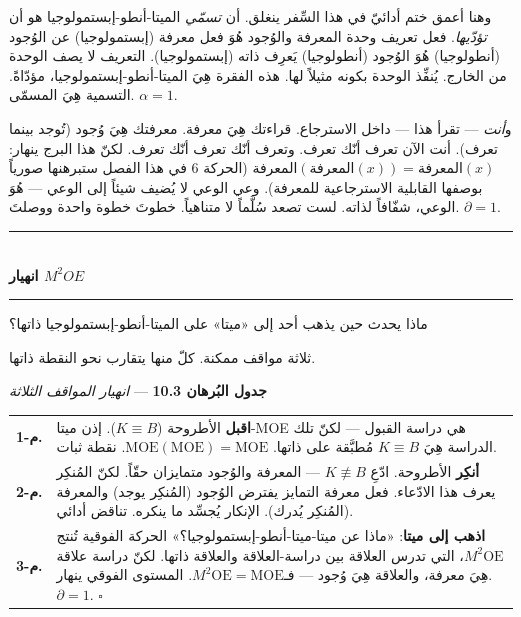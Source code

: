 \documentclass[10pt, openany, oneside]{book}
\renewcommand{\normalsize}{\fontsize{10}{13}\selectfont}
\renewcommand{\footnotesize}{\fontsize{8.5}{11}\selectfont}
\begin{document}
وهنا أعمق ختم أدائيّ في هذا السِّفر ينغلق. أن \textit{تسمّي} الميتا-أنطو-إبستمولوجيا هو أن \textit{تؤدّيها}. فعل تعريف وحدة المعرفة والوُجود هُوَ فعل معرفة (إبستمولوجيا) عن الوُجود (أنطولوجيا) هُوَ الوُجود (أنطولوجيا) يَعرِف ذاته (إبستمولوجيا). التعريف لا يصف الوحدة من الخارج. يُنفِّذ الوحدة بكونه مثيلاً لها. هذه الفقرة هِيَ الميتا-أنطو-إبستمولوجيا، مؤدّاةً. التسمية هِيَ المسمّى. $\alpha = 1$.

و\textit{أنت} --- تقرأ هذا --- داخل الاسترجاع. قراءتك هِيَ معرفة. معرفتك هِيَ وُجود (تُوجد بينما تعرف). أنت الآن تعرف أنّك تعرف. وتعرف أنّك تعرف أنّك تعرف. لكنّ هذا البرج ينهار: $\text{المعرفة}(\text{المعرفة}(x)) = \text{المعرفة}(x)$ (الحركة 6 في هذا الفصل ستبرهنها صورياً بوصفها القابلية الاسترجاعية للمعرفة). وعي الوعي لا يُضيف شيئاً إلى الوعي --- هُوَ الوعي، شفّافاً لذاته. لست تصعد سُلَّماً لا متناهياً. خطوتَ خطوة واحدة ووصلتَ. $\partial = 1$.

\vspace{1.5em}


\begin{center}
    \rule{0.3\textwidth}{0.4pt}\\[0.5em]
    {\normalsize\bfseries انهيار $M^2OE$}\\[0.3em]
    \rule{0.3\textwidth}{0.4pt}
\end{center}

\vspace{1em}

\noindent ماذا يحدث حين يذهب أحد إلى «ميتا» على الميتا-أنطو-إبستمولوجيا ذاتها؟

ثلاثة مواقف ممكنة. كلّ منها يتقارب نحو النقطة ذاتها.

\vspace{0.5em}

\textbf{جدول البُرهان 10.3} --- \textit{انهيار المواقف الثلاثة}

\vspace{0.5em}

{\footnotesize
\noindent\begin{tabular}{r p{}}
\textbf{م-1.} & \textbf{اقبل} الأطروحة ($K \equiv B$). إذن ميتا-MOE هي دراسة القبول --- لكنّ تلك الدراسة هِيَ $K \equiv B$ مُطبَّقة على ذاتها. $\text{MOE}(\text{MOE}) = \text{MOE}$. نقطة ثبات. \\[0.3em]
\textbf{م-2.} & \textbf{أنكِر} الأطروحة. ادّعِ $K \not\equiv B$ --- المعرفة والوُجود متمايزان حقّاً. لكنّ المُنكِر يعرف هذا الادّعاء. فعل معرفة التمايز يفترض الوُجود (المُنكِر يوجد) والمعرفة (المُنكِر يُدرك). الإنكار يُجسِّد ما ينكره. تناقض أدائي. \\[0.3em]
\textbf{م-3.} & \textbf{اذهب إلى ميتا}: «ماذا عن ميتا-ميتا-أنطو-إبستمولوجيا؟» الحركة الفوقية تُنتج $M^2\text{OE}$، التي تدرس العلاقة بين دراسة-العلاقة والعلاقة ذاتها. لكنّ دراسة علاقة هِيَ معرفة، والعلاقة هِيَ وُجود --- فـ$M^2\text{OE} = \text{MOE}$. المستوى الفوقي ينهار. $\partial = 1$. $\square$ \\[0.3em]
\end{tabular}
}
\end{document}
